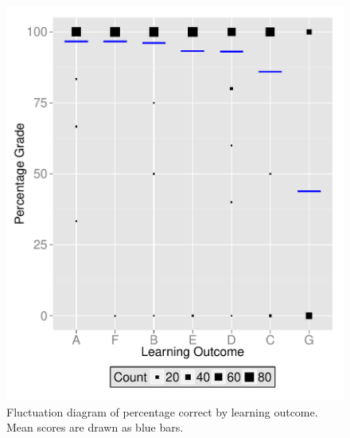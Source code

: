 \documentclass[12pt,english,nohyper]{tufte-handout}\usepackage[]{graphicx}\usepackage[]{color}
\begin{document}
\begin{figure}[!ht]
\includegraphics[width=\linewidth]{Topic01_LM_LearningObj_boxplot.pdf}
\caption{Fluctuation diagram of percentage correct by learning outcome. Mean scores are drawn as blue bars.}
\label{fig:LearningObj_summary}
\end{figure}
\end{document}
